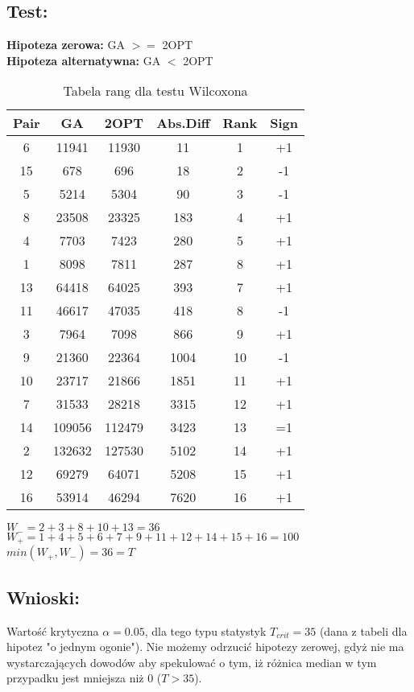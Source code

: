     \subsection{Test: }
    \textbf{Hipoteza zerowa: } GA $>=$ 2OPT \\
    \textbf{Hipoteza alternatywna: } GA $<$ 2OPT \\
    \begin{table}[!ht]
      \centering
      \begin{tabular}{| c | c | c | c | c | c |}
        \hline
        Pair & GA & 2OPT & Abs.Diff & Rank & Sign \\
        \hline
        6 & 11941 & 11930 & 11 & 1 & +1 \\
        15 & 678 & 696 & 18 & 2 & -1 \\
        5 & 5214 & 5304 & 90 & 3 & -1 \\
        8 & 23508 & 23325 & 183 & 4 & +1 \\
        4 & 7703 & 7423 & 280 & 5 & +1 \\
        1 & 8098 & 7811 & 287 & 8 & +1 \\
        13 & 64418 & 64025 & 393 & 7 & +1 \\
        11 & 46617 & 47035 & 418 & 8 & -1 \\
        3 & 7964 & 7098 & 866 & 9 & +1 \\
        9 & 21360 & 22364 & 1004 & 10 & -1 \\
        10 & 23717 & 21866 & 1851 & 11 & +1 \\
        7 & 31533 & 28218 & 3315 & 12 & +1 \\
        14 & 109056 & 112479 & 3423 & 13 & =1 \\
        2 & 132632 & 127530 & 5102 & 14 & +1 \\
        12 & 69279 & 64071 & 5208 & 15 & +1 \\
        16 & 53914 & 46294 & 7620 & 16 & +1 \\

        \hline
          
      \end{tabular}
      \caption{Tabela rang dla testu Wilcoxona}
      $W_{-} = 2+3+8+10+13=36 $
      $W_{+} = 1+4+5+6+7+9+11+12+14+15+16 = 100 $
      $min(W_{+},W_{-}) = 36 = T$
  
    \end{table}
  \subsection{Wnioski: }
  Wartość krytyczna $\alpha = 0.05$, dla tego typu statystyk $T_{crit} = 35$ (dana z tabeli dla hipotez "o jednym ogonie").
  Nie możemy odrzucić hipotezy zerowej, gdyż nie ma wystarczających dowodów aby spekulować o tym, iż różnica median w tym przypadku jest mniejsza niż 0 ($ T > 35$).
    